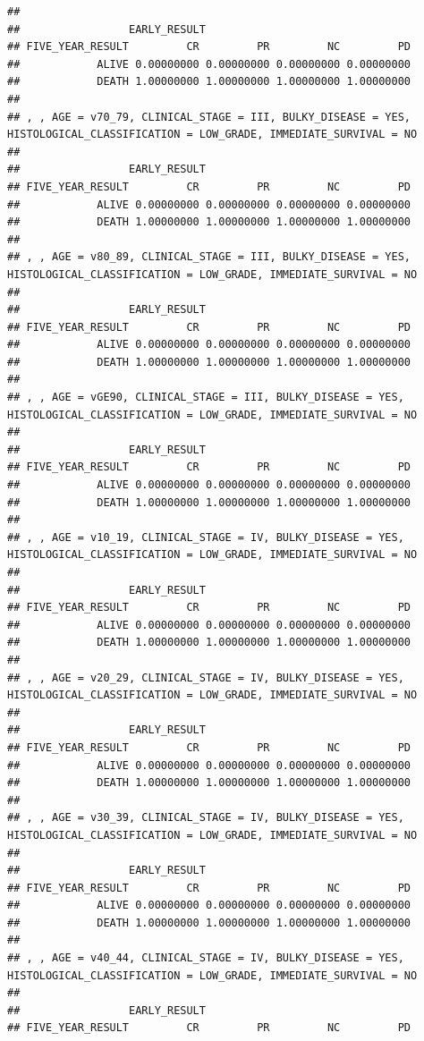 \documentclass[]{article}
\begin{document}
\begin{verbatim}
## 
##                 EARLY_RESULT
## FIVE_YEAR_RESULT         CR         PR         NC         PD
##            ALIVE 0.00000000 0.00000000 0.00000000 0.00000000
##            DEATH 1.00000000 1.00000000 1.00000000 1.00000000
## 
## , , AGE = v70_79, CLINICAL_STAGE = III, BULKY_DISEASE = YES, HISTOLOGICAL_CLASSIFICATION = LOW_GRADE, IMMEDIATE_SURVIVAL = NO
## 
##                 EARLY_RESULT
## FIVE_YEAR_RESULT         CR         PR         NC         PD
##            ALIVE 0.00000000 0.00000000 0.00000000 0.00000000
##            DEATH 1.00000000 1.00000000 1.00000000 1.00000000
## 
## , , AGE = v80_89, CLINICAL_STAGE = III, BULKY_DISEASE = YES, HISTOLOGICAL_CLASSIFICATION = LOW_GRADE, IMMEDIATE_SURVIVAL = NO
## 
##                 EARLY_RESULT
## FIVE_YEAR_RESULT         CR         PR         NC         PD
##            ALIVE 0.00000000 0.00000000 0.00000000 0.00000000
##            DEATH 1.00000000 1.00000000 1.00000000 1.00000000
## 
## , , AGE = vGE90, CLINICAL_STAGE = III, BULKY_DISEASE = YES, HISTOLOGICAL_CLASSIFICATION = LOW_GRADE, IMMEDIATE_SURVIVAL = NO
## 
##                 EARLY_RESULT
## FIVE_YEAR_RESULT         CR         PR         NC         PD
##            ALIVE 0.00000000 0.00000000 0.00000000 0.00000000
##            DEATH 1.00000000 1.00000000 1.00000000 1.00000000
## 
## , , AGE = v10_19, CLINICAL_STAGE = IV, BULKY_DISEASE = YES, HISTOLOGICAL_CLASSIFICATION = LOW_GRADE, IMMEDIATE_SURVIVAL = NO
## 
##                 EARLY_RESULT
## FIVE_YEAR_RESULT         CR         PR         NC         PD
##            ALIVE 0.00000000 0.00000000 0.00000000 0.00000000
##            DEATH 1.00000000 1.00000000 1.00000000 1.00000000
## 
## , , AGE = v20_29, CLINICAL_STAGE = IV, BULKY_DISEASE = YES, HISTOLOGICAL_CLASSIFICATION = LOW_GRADE, IMMEDIATE_SURVIVAL = NO
## 
##                 EARLY_RESULT
## FIVE_YEAR_RESULT         CR         PR         NC         PD
##            ALIVE 0.00000000 0.00000000 0.00000000 0.00000000
##            DEATH 1.00000000 1.00000000 1.00000000 1.00000000
## 
## , , AGE = v30_39, CLINICAL_STAGE = IV, BULKY_DISEASE = YES, HISTOLOGICAL_CLASSIFICATION = LOW_GRADE, IMMEDIATE_SURVIVAL = NO
## 
##                 EARLY_RESULT
## FIVE_YEAR_RESULT         CR         PR         NC         PD
##            ALIVE 0.00000000 0.00000000 0.00000000 0.00000000
##            DEATH 1.00000000 1.00000000 1.00000000 1.00000000
## 
## , , AGE = v40_44, CLINICAL_STAGE = IV, BULKY_DISEASE = YES, HISTOLOGICAL_CLASSIFICATION = LOW_GRADE, IMMEDIATE_SURVIVAL = NO
## 
##                 EARLY_RESULT
## FIVE_YEAR_RESULT         CR         PR         NC         PD

\end{verbatim}
\end{document}
